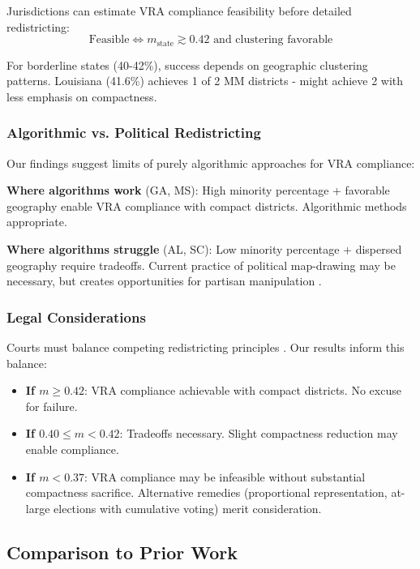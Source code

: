 Jurisdictions can estimate VRA compliance feasibility before detailed redistricting:
\begin{equation}
\text{Feasible} \iff m_{\text{state}} \gtrsim 0.42 \text{ and clustering favorable}
\end{equation}

For borderline states (40-42\%), success depends on geographic clustering patterns. Louisiana (41.6\%) achieves 1 of 2 MM districts - might achieve 2 with less emphasis on compactness.

\subsubsection{Algorithmic vs. Political Redistricting}

Our findings suggest limits of purely algorithmic approaches for VRA compliance:

\textbf{Where algorithms work} (GA, MS): High minority percentage + favorable geography enable VRA compliance with compact districts. Algorithmic methods appropriate.

\textbf{Where algorithms struggle} (AL, SC): Low minority percentage + dispersed geography require tradeoffs. Current practice of political map-drawing may be necessary, but creates opportunities for partisan manipulation \citep{stephanopoulos2015}.

\subsubsection{Legal Considerations}

Courts must balance competing redistricting principles \citep{pildes2002}. Our results inform this balance:

\begin{itemize}
\item \textbf{If $m \geq 0.42$}: VRA compliance achievable with compact districts. No excuse for failure.
\item \textbf{If $0.40 \leq m < 0.42$}: Tradeoffs necessary. Slight compactness reduction may enable compliance.
\item \textbf{If $m < 0.37$}: VRA compliance may be infeasible without substantial compactness sacrifice. Alternative remedies (proportional representation, at-large elections with cumulative voting) merit consideration.
\end{itemize}

\subsection{Comparison to Prior Work}

